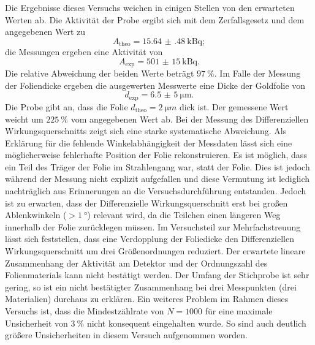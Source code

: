 %
%
Die Ergebnisse dieses Versuchs weichen in einigen Stellen von den erwarteten Werten ab.
Die Aktivität der Probe ergibt sich mit dem Zerfallsgesetz und dem angegebenen Wert zu
\begin{equation*}
	A_{\text{theo}} = \SI{15.64(48)}{\kilo\becquerel};
\end{equation*}
die Messungen ergeben eine Aktivität von
\begin{equation*}
	A_{\text{exp}}= \SI{501(15)}{\kilo\becquerel}.
\end{equation*}
Die relative Abweichung der beiden Werte beträgt $\SI{97}{\%}$.
Im Falle der Messung der Foliendicke ergeben die ausgewerten Messwerte eine Dicke der Goldfolie von
\begin{equation*}
	d_{\text{exp}}= \SI{6,5(5)}{\micro \meter}.
\end{equation*}
Die Probe gibt an, dass die Folie $d_{\text{theo}} =\SI{2}{\micro m}$ dick ist.
Der gemessene Wert weicht um $\SI{225}{\%}$ vom angegebenen Wert ab.
Bei der Messung des Differenziellen Wirkungsquerschnitts zeigt sich eine starke systematische Abweichung.
Als Erklärung für die fehlende Winkelabhängigkeit der Messdaten lässt sich eine möglicherweise fehlerhafte Position der Folie rekonstruieren.
Es ist möglich, dass ein Teil des Träger der Folie im Strahlengang war, statt der Folie.
Dies ist jedoch während der Messung nicht explizit aufgefallen und diese Vermutung ist lediglich nachträglich aus Erinnerungen an die Versuchsdurchführung entstanden.
Jedoch ist zu erwarten, dass der Differenzielle Wirkungsquerschnitt erst bei großen Ablenkwinkeln ($>\SI{1}{°}$) relevant wird, da die Teilchen einen längeren Weg innerhalb der Folie zurücklegen müssen.
Im Versuchsteil zur Mehrfachstreuung lässt sich feststellen, dass eine Verdopplung der Foliedicke den Differenziellen Wirkungsquerschnitt um drei Größenordnungen reduziert.
Der erwartete lineare Zusammenhang der Aktivität am Detektor und der Ordnungszahl des Folienmaterials kann nicht bestätigt werden.
Der Umfang der Stichprobe ist sehr gering, so ist ein nicht bestätigter Zusammenhang bei drei Messpunkten (drei Materialien) durchaus zu erklären.
Ein weiteres Problem im Rahmen dieses Versuchs ist, dass die Mindestzählrate von $N=1000$ für eine maximale Unsicherheit von $\SI{3}{\%}$ nicht konsequent eingehalten wurde.
So sind auch deutlich größere Unsicherheiten in diesem Versuch aufgenommen worden.
